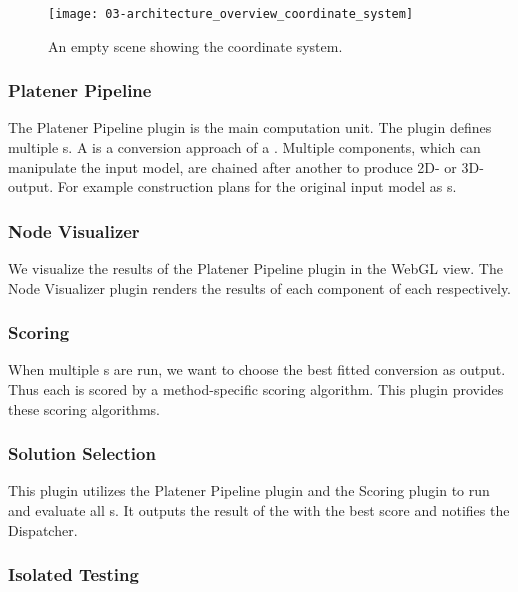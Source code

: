 \documentclass[../ClassicThesis.tex]{subfiles}
\begin{document}
\begin{figure}
  \label{fig:architecture_overview_coordinate_system}
  \texttt{[image: 03-architecture\_overview\_coordinate\_system]}
  \caption{An empty scene showing the coordinate system.}
\end{figure}

\subsubsection{Platener Pipeline}

The Platener Pipeline plugin is the main computation unit. The plugin defines
multiple {\fabmethod}s. A {\fabmethod} is a conversion approach of a
\threedmodel. Multiple components, which can manipulate the input model, are
chained after another to produce 2D- or 3D-output. For example construction
plans for the original input model as {\svgfile}s.

\subsubsection{Node Visualizer}

We visualize the results of the Platener Pipeline plugin in the WebGL view. The
Node Visualizer plugin renders the results of each component of each
{\fabmethod} respectively.

\subsubsection{Scoring}

When multiple {\fabmethod}s are run, we want to choose the best fitted
conversion as output. Thus each {\fabmethod} is scored by a method-specific
scoring algorithm. This plugin provides these scoring algorithms.

\subsubsection{Solution Selection}

This plugin utilizes the Platener Pipeline plugin and the Scoring plugin to run
and evaluate all {\fabmethod}s. It outputs the result of the {\fabmethod} with
the best score and notifies the Dispatcher.

\subsubsection{Isolated Testing}
\end{document}
